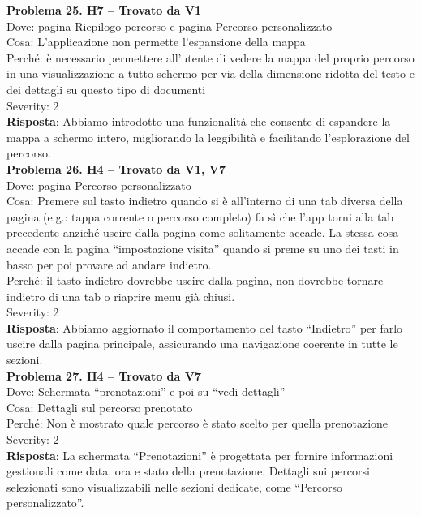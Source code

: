 \documentclass{article}
\begin{document}
\noindent \textbf{Problema 25. H7 – Trovato da V1} \\
Dove: pagina Riepilogo percorso e pagina Percorso personalizzato \\
Cosa: L’applicazione non permette l’espansione della mappa \\
Perché: è necessario permettere all’utente di vedere la mappa del proprio percorso in una visualizzazione a tutto schermo per via della dimensione ridotta del testo e dei dettagli su questo tipo di documenti \\
Severity: 2 \\
\textbf{Risposta}: Abbiamo introdotto una funzionalità che consente di espandere la mappa a schermo intero, migliorando la leggibilità e facilitando l’esplorazione del percorso.\\

\noindent \textbf{Problema 26. H4 – Trovato da V1, V7} \\
Dove: pagina Percorso personalizzato \\
Cosa: Premere sul tasto indietro quando si è all’interno di una tab diversa della pagina (e.g.: tappa corrente o percorso completo) fa sì che l’app torni alla tab precedente anziché uscire dalla pagina come solitamente accade. La stessa cosa accade con la pagina “impostazione visita” quando si preme su uno dei tasti in basso per poi provare ad andare indietro. \\
Perché: il tasto indietro dovrebbe uscire dalla pagina, non dovrebbe tornare indietro di una tab o riaprire menu già chiusi. \\
Severity: 2 \\
\textbf{Risposta}: Abbiamo aggiornato il comportamento del tasto “Indietro” per farlo uscire dalla pagina principale, assicurando una navigazione coerente in tutte le sezioni.\\

\noindent \textbf{Problema 27. H4 – Trovato da V7} \\
Dove: Schermata “prenotazioni” e poi su “vedi dettagli” \\
Cosa: Dettagli sul percorso prenotato \\
Perché: Non è mostrato quale percorso è stato scelto per quella prenotazione \\
Severity: 2 \\
\textbf{Risposta}: La schermata “Prenotazioni” è progettata per fornire informazioni gestionali come data, ora e stato della prenotazione. Dettagli sui percorsi selezionati sono visualizzabili nelle sezioni dedicate, come “Percorso personalizzato”.\\
\end{document}
